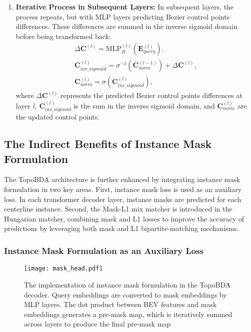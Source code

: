 \begin{enumerate}
    \item \textbf{Iterative Process in Subsequent Layers:}
    In subsequent layers, the process repeats, but with MLP layers predicting Bezier control points differences. These differences are summed in the inverse sigmoid domain before being transformed back:
    \begin{equation}
    \begin{aligned}
        \Delta \mathbf{C}^{(l)} = \text{MLP}_{B}^{(l)}(\mathbf{E}_{query}^{(l)}), \\
        \mathbf{C}_{inv\_sigmoid}^{(l)} = \sigma^{-1}(\mathbf{C}_{norm}^{(l-1)}) + \Delta \mathbf{C}^{(l)}, \\
        \mathbf{C}_{norm}^{(l)} = \sigma(\mathbf{C}_{inv\_sigmoid}^{(l)}),
    \end{aligned}
    \end{equation}
    where $\Delta \mathbf{C}^{(l)}$ represents the predicted Bezier control points differences at layer $l$, $\mathbf{C}_{inv\_sigmoid}^{(l)}$ is the sum in the inverse sigmoid domain, and $\mathbf{C}_{norm}^{(l)}$ are the updated control points.
\end{enumerate}



\subsection{The Indirect Benefits of Instance Mask Formulation}
\label{sec: indirect_benefits_of_instance_mask_formulation}

The TopoBDA architecture is further enhanced by integrating instance mask formulation in two key areas. First, instance mask loss is used as an auxiliary loss. In each transformer decoder layer, instance masks are predicted for each centerline instance. Second, the Mask-L1 mix matcher is introduced in the Hungarian matcher, combining mask and L1 losses to improve the accuracy of predictions by leveraging both mask and L1 bipartite-matching mechanisms.

\subsubsection{Instance Mask Formulation as an Auxiliary Loss}

\begin{figure}[tb]
  \centering
  \texttt{[image: mask\_head.pdf]}
  \caption{The implementation of instance mask formulation in the TopoBDA decoder. Query embeddings are converted to mask embeddings by MLP layers. The dot product between BEV features and mask embeddings generates a pre-mask map, which is iteratively summed across layers to produce the final pre-mask map}
  \label{fig: mask_head_in_decoder}
\end{figure}

